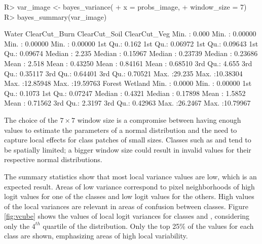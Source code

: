 \documentclass[
  shortnames]{jss}
\begin{document}
\begin{CodeChunk}
\begin{CodeInput}
R> var_image <- bayes_variance(
+     x = probs_image,
+     window_size = 7)
R> bayes_summary(var_image)
\end{CodeInput}
\begin{CodeOutput}
 Water            ClearCut_Burn      ClearCut_Soil      ClearCut_Veg      
 Min.   : 0.000   Min.   : 0.00000   Min.   : 0.00000   Min.   : 0.00000  
 1st Qu.: 0.162   1st Qu.: 0.06972   1st Qu.: 0.09643   1st Qu.: 0.09674  
 Median : 2.235   Median : 0.15967   Median : 0.23739   Median : 0.23686  
 Mean   : 2.518   Mean   : 0.43250   Mean   : 0.84161   Mean   : 0.68510  
 3rd Qu.: 4.655   3rd Qu.: 0.35117   3rd Qu.: 0.64401   3rd Qu.: 0.70521  
 Max.   :29.235   Max.   :10.38304   Max.   :12.85948   Max.   :19.59763  
 Forest            Wetland           
 Min.   : 0.0000   Min.   : 0.00000  
 1st Qu.: 0.1073   1st Qu.: 0.07247  
 Median : 0.4321   Median : 0.17898  
 Mean   : 1.5852   Mean   : 0.71562  
 3rd Qu.: 2.3197   3rd Qu.: 0.42963  
 Max.   :26.2467   Max.   :10.79967  
\end{CodeOutput}
\end{CodeChunk}

The choice of the \(7 \times 7\) window size is a compromise between having enough values to
estimate the parameters of a normal distribution and the need to capture local effects
for class patches of small sizes. Classes such as  and 
tend to be spatially limited; a bigger window size could result in invalid values for
their respective normal distributions.

The summary statistics show that most local variance values are low, which is an expected result. Areas of low variance correspond to pixel neighborhoods of high logit values for one of the classes and low logit values for the others. High values of the local variances are relevant in areas of confusion between classes. Figure \ref{fig:vcube} shows the values of local logit variances for classes  and , considering only the \(4^{th}\) quartile of the distribution. Only the top 25\% of the values for each class are shown, emphasizing areas of high local variability.
\end{document}
